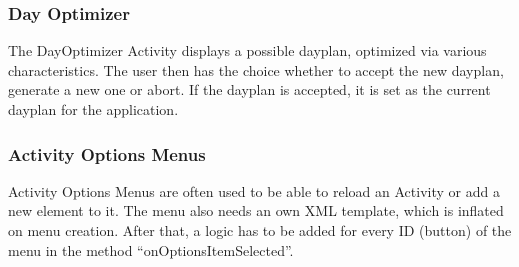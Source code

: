 \subsubsection{Day Optimizer} %
\label{ssub:DayOptimizer}
The DayOptimizer Activity displays a possible dayplan, optimized via various
characteristics. The user then has the choice whether to accept the new
dayplan, generate a new one or abort. If the dayplan is accepted, it is set
as the current dayplan for the application.


\subsubsection{Activity Options Menus} %
\label{ssub:ActivityMenus}
Activity Options Menus are often used to be able to reload an Activity or add
a new element to it. The menu also needs an own XML template, which is
inflated on menu creation. After that, a logic has to be added for every
ID (button) of the menu in the method ``onOptionsItemSelected''.

